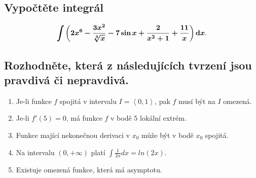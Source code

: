 \documentclass[12pt]{article}
\begin{document}
    \subsection{\textnormal{Vypočtěte integrál}}
    \begin{tcolorbox}
        $$ \bm{\int \left( 2x^{6} - \frac{3x^{2}}{\sqrt[3]{x}} 
        - 7\sin{x} + \frac{2}{x^{2} + 1} + \frac{11}{x} \right) \mathop{}\!\mathrm{d}{x} }. $$
    \end{tcolorbox}
        
        \pagebreak

    \subsection{\textnormal{
        Rozhodněte, která z následujících 
        tvrzení jsou pravdivá či nepravdivá.
    }}
    \begin{enumerate}[
        label=(\alph*), 
        noitemsep,
        topsep=0pt,
        parsep=2pt,
        partopsep=0pt,
        labelwidth=5cm,
        align=right,
        itemindent=1.2cm
    ]
        \item Je-li funkce $f$ spojitá v intervalu $I = \left<0,1\right>$, pak $f$ musí být na $I$ omezená.
        \item Je-li $f'(5) = 0$, má funkce $f$ v bodě 5 lokální extrém.
        \item Funkce mající nekonečnou derivaci v $x_{0}$ může být v bodě $x_{0}$ spojitá.
        \item Na intervalu $(0, +\infty)$ platí $\int \frac{1}{2x}dx = ln(2x)$.
        \item Existuje omezená funkce, která má asymptotu.
    \end{enumerate}
    
    
\end{document}
